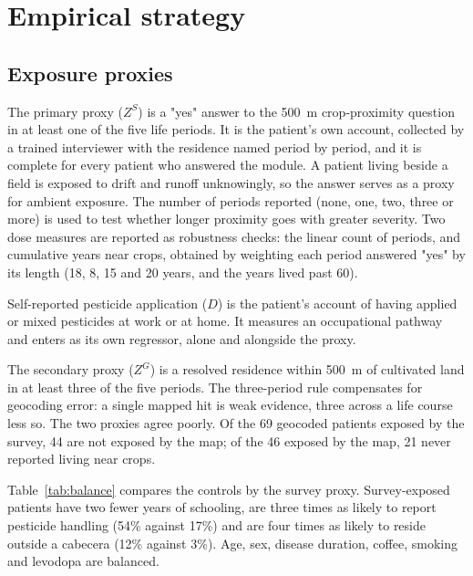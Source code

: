 \documentclass[11pt,a4paper]{article}
\begin{document}
\section{Empirical strategy}

\subsection{Exposure proxies}

The primary proxy ($Z^{S}$) is a "yes" answer to the 500~m crop-proximity question in at least one of the five life periods. It is the patient's own account, collected by a trained interviewer with the residence named period by period, and it is complete for every patient who answered the module. A patient living beside a field is exposed to drift and runoff unknowingly, so the answer serves as a proxy for ambient exposure. The number of periods reported (none, one, two, three or more) is used to test whether longer proximity goes with greater severity. Two dose measures are reported as robustness checks: the linear count of periods, and cumulative years near crops, obtained by weighting each period answered "yes" by its length (18, 8, 15 and 20 years, and the years lived past 60).

Self-reported pesticide application ($D$) is the patient's account of having applied or mixed pesticides at work or at home. It measures an occupational pathway and enters as its own regressor, alone and alongside the proxy.

The secondary proxy ($Z^{G}$) is a resolved residence within 500~m of cultivated land in at least three of the five periods. The three-period rule compensates for geocoding error: a single mapped hit is weak evidence, three across a life course less so. The two proxies agree poorly. Of the 69 geocoded patients exposed by the survey, 44 are not exposed by the map; of the 46 exposed by the map, 21 never reported living near crops.

Table~\ref{tab:balance} compares the controls by the survey proxy. Survey-exposed patients have two fewer years of schooling, are three times as likely to report pesticide handling (54\% against 17\%) and are four times as likely to reside outside a cabecera (12\% against 3\%). Age, sex, disease duration, coffee, smoking and levodopa are balanced.

\begin{table}[H]\centering\footnotesize
\caption{Balance of controls by the survey proxy (Welch t-test)}\label{tab:balance}

\end{table}
\end{document}
